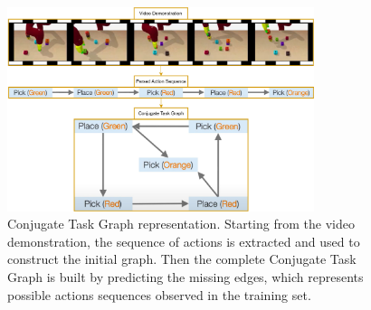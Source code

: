\begin{figure}[t]
    \centering
    \includegraphics[width=0.8\textwidth]{figures/images/ch4/conjugate_task_graph.jpg}
    \caption{Conjugate Task Graph representation. Starting from the video demonstration, the sequence of actions is extracted and used to construct the initial graph. Then the complete Conjugate Task Graph is built by predicting the missing edges, which represents possible actions sequences observed in the training set.}
    \label{fig:conjugate_task_graph}
\end{figure}
